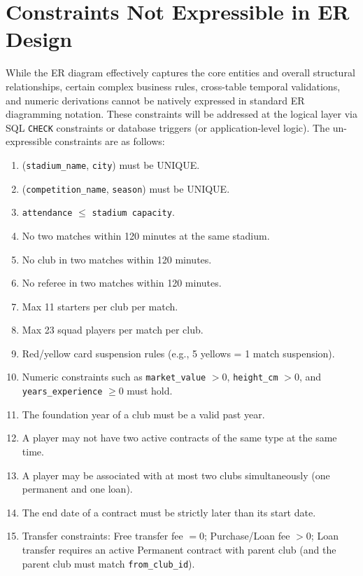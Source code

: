 \documentclass[12pt, a4paper]{article}
\begin{document}
\newpage
\section{Constraints Not Expressible in ER Design}

While the ER diagram effectively captures the core entities and overall structural relationships, certain complex business rules, cross-table temporal validations, and numeric derivations cannot be natively expressed in standard ER diagramming notation. These constraints will be addressed at the logical layer via SQL \texttt{CHECK} constraints or database triggers (or application-level logic). The un-expressible constraints are as follows:

\begin{enumerate}
    \item (\texttt{stadium\_name}, \texttt{city}) must be UNIQUE.
    \item (\texttt{competition\_name}, \texttt{season}) must be UNIQUE.
    \item \texttt{attendance} $\le$ \texttt{stadium capacity}.
    \item No two matches within 120 minutes at the same stadium.
    \item No club in two matches within 120 minutes.
    \item No referee in two matches within 120 minutes.
    \item Max 11 starters per club per match.
    \item Max 23 squad players per match per club.
    \item Red/yellow card suspension rules (e.g., 5 yellows = 1 match suspension).
    \item Numeric constraints such as \texttt{market\_value} $> 0$, \texttt{height\_cm} $> 0$, and \texttt{years\_experience} $\ge 0$ must hold.
    \item The foundation year of a club must be a valid past year.
    \item A player may not have two active contracts of the same type at the same time.
    \item A player may be associated with at most two clubs simultaneously (one permanent and one loan).
    \item The end date of a contract must be strictly later than its start date.
    \item Transfer constraints: Free transfer fee $= 0$; Purchase/Loan fee $> 0$; Loan transfer requires an active Permanent contract with parent club (and the parent club must match \texttt{from\_club\_id}).

\end{enumerate}
\end{document}
